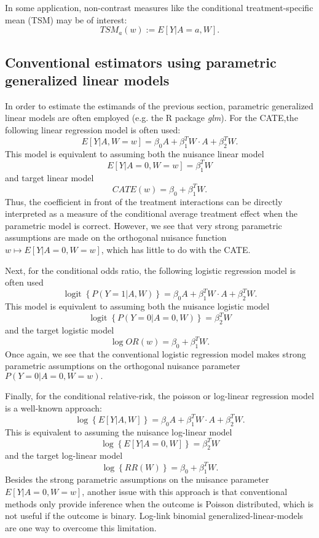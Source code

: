 \documentclass{article}
\DeclareMathOperator{\logit}{logit}
\begin{document}
In some application, non-contrast measures like the conditional treatment-specific mean (TSM) may be of interest:
\begin{equation}
TSM_a(w) := E[Y|A=a,W].
\end{equation}

\subsection{Conventional estimators using parametric generalized linear models}
In order to estimate the estimands of the previous section, parametric generalized linear models are often employed (e.g. the R package \textit{glm}). For the CATE,the following linear regression model is often used:
$$E[Y|A, W=w] = \beta_0 A +  \beta_1^T W \cdot A + \beta_2^T W.$$
This model is equivalent to assuming both the nuisance linear model
$$E[Y|A=0,W=w] =  \beta_1^T W$$
and target linear model
$$CATE(w) = \beta_0 + \beta_1^T W.$$
Thus, the coefficient in front of the treatment interactions can be directly interpreted as a measure of the conditional average treatment effect when the parametric model is correct. However, we see that very strong parametric assumptions are made on the orthogonal nuisance function $w \mapsto E[Y|A=0,W=w]$, which has little to do with the CATE.

Next, for the conditional odds ratio, the following logistic regression model is often used
$$\logit \left\{P(Y=1|A,W) \right\} =  \beta_0 A +  \beta_1^T W \cdot A + \beta_2^T W.$$
This model is equivalent to assuming both the nuisance logistic model
$$\logit\left\{P(Y=0|A=0,W) \right\} =   \beta_2^T W$$
and the target logistic model
$$\log OR(w) =  \beta_0  +  \beta_1^T W. $$
Once again, we see that the conventional logistic regression model makes strong parametric assumptions on the orthogonal nuisance parameter $P(Y=0|A=0,W=w).$

Finally, for the conditional relative-risk, the poisson or log-linear regression model is a well-known approach:
$$\log \left\{E[Y|A,W] \right\} =  \beta_0 A +  \beta_1^T W \cdot A + \beta_2^T W.$$
This is equivalent to assuming the nuisance log-linear model
$$\log \left\{E[Y|A=0,W] \right\} = \beta_2^T W$$
and the target log-linear model
$$\log \left\{RR(W) \right\} =  \beta_0  +  \beta_1^T W. $$
Besides the strong parametric assumptions on the nuisance parameter $E[Y|A=0,W=w]$, another issue with this approach is that conventional methods only provide inference when the outcome is Poisson distributed, which is not useful if the outcome is binary. Log-link binomial generalized-linear-models are one way to overcome this limitation. 
\end{document}
